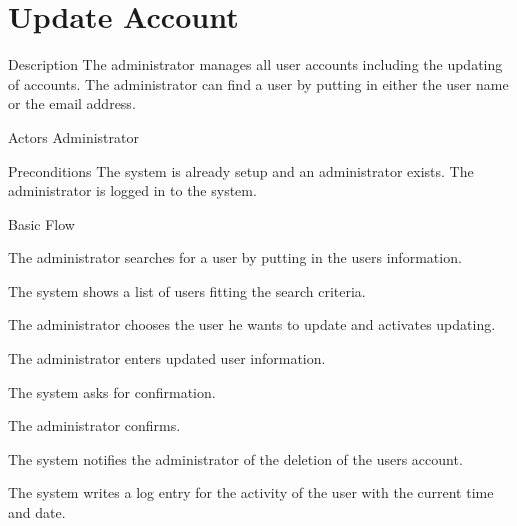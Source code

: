 \section{Update Account}

%
\begin{cpart}{Description}
The administrator manages all user accounts including the updating of accounts. The administrator can find a user by putting in either the user name or the email address.
\end{cpart}


%
\begin{cpart}{Actors}
Administrator
\end{cpart}

%
\begin{cpart}{Preconditions}
The system is already setup and an administrator exists. The administrator is logged in to the system.
\end{cpart}

%
\begin{cpartList}{Basic Flow}
  \item The administrator searches for a user by putting in the users information.
  \item The system shows a list of users fitting the search criteria.
  \item The administrator chooses the user he wants to update and activates updating.
  \item The administrator enters updated user information.
  \item The system asks for confirmation.
  \item The administrator confirms.
  \item The system notifies the administrator of the deletion of the users account.
    \item The system writes a log entry for the activity of the user with the current time and date.
\end{cpartList}

